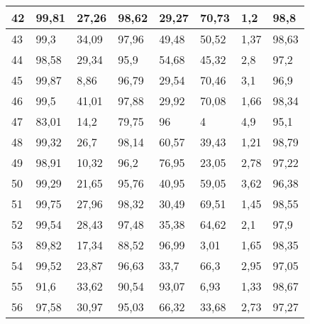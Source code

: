 \begin{longtable}[c]{|l|l|l|l|l|l|l|l|}
42              & 99,81        & 27,26        & 98,62       & 29,27         & 70,73         & 1,2           & 98,8          \\ \hline
43              & 99,3         & 34,09        & 97,96       & 49,48         & 50,52         & 1,37          & 98,63         \\ \hline
44              & 98,58        & 29,34        & 95,9        & 54,68         & 45,32         & 2,8           & 97,2          \\ \hline
45              & 99,87        & 8,86         & 96,79       & 29,54         & 70,46         & 3,1           & 96,9          \\ \hline
46              & 99,5         & 41,01        & 97,88       & 29,92         & 70,08         & 1,66          & 98,34         \\ \hline
47              & 83,01        & 14,2         & 79,75       & 96            & 4             & 4,9           & 95,1          \\ \hline
48              & 99,32        & 26,7         & 98,14       & 60,57         & 39,43         & 1,21          & 98,79         \\ \hline
49              & 98,91        & 10,32        & 96,2        & 76,95         & 23,05         & 2,78          & 97,22         \\ \hline
50              & 99,29        & 21,65        & 95,76       & 40,95         & 59,05         & 3,62          & 96,38         \\ \hline
51              & 99,75        & 27,96        & 98,32       & 30,49         & 69,51         & 1,45          & 98,55         \\ \hline
52              & 99,54        & 28,43        & 97,48       & 35,38         & 64,62         & 2,1           & 97,9          \\ \hline
53              & 89,82        & 17,34        & 88,52       & 96,99         & 3,01          & 1,65          & 98,35         \\ \hline
54              & 99,52        & 23,87        & 96,63       & 33,7          & 66,3          & 2,95          & 97,05         \\ \hline
55              & 91,6         & 33,62        & 90,54       & 93,07         & 6,93          & 1,33          & 98,67         \\ \hline
56              & 97,58        & 30,97        & 95,03       & 66,32         & 33,68         & 2,73          & 97,27         \\ \hline

\end{longtable}
